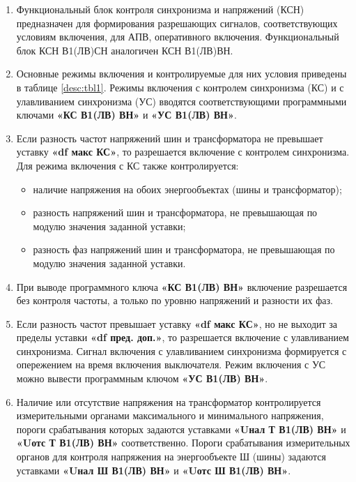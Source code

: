 \documentclass[a4paper, 12pt, table, hidelinks, DIV=calc]{extarticle}
\begin{document}
\begin{enumerate}[label=\arabic{section}.\arabic{subsection}.\arabic{subsubsection}.\arabic*,  align=left, labelsep=4pt, leftmargin=0pt, itemindent=57pt]

\item
Функциональный блок контроля синхронизма и напряжений (КСН) предназначен для формирования разрешающих сигналов, соответствующих условиям включения, для АПВ, оперативного включения. Функциональный блок КСН В1(ЛВ)СН аналогичен КСН В1(ЛВ)ВН.

\item
Основные режимы включения и контролируемые для них условия приведены в таблице \ref{desc:tbl1}. Режимы включения с контролем синхронизма (КС) и с улавливанием синхронизма (УС) вводятся соответствующими программными ключами \textbf{«КС В1(ЛВ) ВН»} и \textbf{«УС В1(ЛВ) ВН»}.

\item
Если разность частот напряжений шин и трансформатора не превышает уставку \textbf{«df макс КС»}, то разрешается включение с контролем синхронизма. Для режима включения с КС также контролируется:
\begin{itemize}
\item наличие напряжения на обоих энергообъектах (шины и трансформатор);
\item разность напряжений шин и трансформатора, не превышающая по модулю значения заданной уставки;
\item разность фаз напряжений шин и трансформатора, не превышающая по модулю значения заданной уставки.
\end{itemize}

\item
При выводе программного ключа \textbf{«КС В1(ЛВ) ВН»} включение разрешается без контроля частоты, а только по уровню напряжений и разности их фаз.

\item
Если разность частот превышает уставку \textbf{«df макс КС»}, но не выходит за пределы уставки \textbf{«df пред. доп.»}, то разрешается включение с улавливанием синхронизма. Сигнал включения с улавливанием синхронизма формируется с опережением на время включения выключателя. Режим включения с УС можно вывести программным ключом \textbf{«УС В1(ЛВ) ВН»}.

\item
Наличие или отсутствие напряжения на трансформатор контролируется измерительными органами максимального и минимального напряжения, пороги срабатывания которых задаются уставками \textbf{«Uнал Т В1(ЛВ) ВН»} и \textbf{«Uотс Т В1(ЛВ) ВН»} соответственно. Пороги срабатывания измерительных органов для контроля напряжения на энергообъекте Ш (шины) задаются уставками \textbf{«Uнал Ш В1(ЛВ) ВН»} и \textbf{«Uотс Ш В1(ЛВ) ВН»}.


\end{enumerate}
\end{document}
